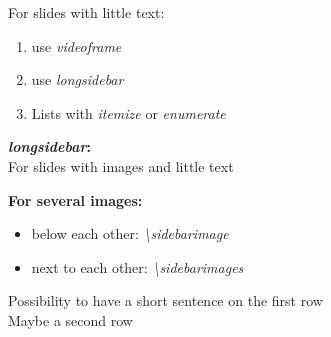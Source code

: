 \documentclass[12, t, aspectratio=169]{beamer}
\author{Prof. Frieda Friedlich}
\institute{University of XY, Institute XY}  %
\begin{document}
\authorframe

\begin{videoframe}
    \begin{longsidebar}
        For slides with little text:
        \begin{enumerate}
            \item use \textit{videoframe}
            \item use \textit{longsidebar}
            \item Lists with \textit{itemize} or \textit{enumerate}
        \end{enumerate}
    \end{longsidebar}
\end{videoframe}

\begin{videoframe}
    \begin{longsidebar}
        \textbf{\textit{longsidebar}:} \\
        For slides with images and little text
    \end{longsidebar}
\end{videoframe}

\begin{videoframe}
    \begin{longsidebar}
    \end{longsidebar}
\end{videoframe}

\begin{videoframe}
    \begin{longsidebar}
        \textbf{For several images:}
        \begin{itemize}
            \item below each other: \textit{\textbackslash sidebarimage}
            \item next to each other: \textit{\textbackslash sidebarimages}
        \end{itemize}
    \end{longsidebar}
\end{videoframe}

\begin{frame}
    \begin{horizontalbar}
        Possibility to have a short sentence on the first row\\
        Maybe a second row
    \end{horizontalbar}
\end{frame}
\end{document}
